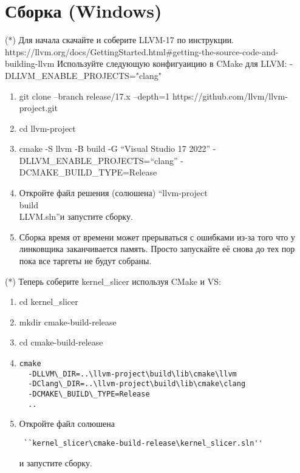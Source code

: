 \documentclass[11pt,fleqn,english,russian]{report} %
\begin{document}
\newpage

\section{Сборка (Windows)}

(*) Для начала скачайте и соберите LLVM-17 по инструкции. \newline https://llvm.org/docs/GettingStarted.html\#getting-the-source-code-and-building-llvm \newline
Используйте следующую конфигуаицию в CMake для LLVM: -DLLVM\_ENABLE\_PROJECTS="clang"
\begin{enumerate}
\item git clone --branch release/17.x --depth=1 https://github.com/llvm/llvm-project.git
\item cd llvm-project
\item cmake -S llvm -B build -G ``Visual Studio 17 2022'' -DLLVM\_ENABLE\_PROJECTS=``clang'' -DCMAKE\_BUILD\_TYPE=Release
\item Откройте файл решения (солюшена) ``llvm-project\\build\\LLVM.sln''и запустите сборку.
\item Сборка время от времени может прерываться с ошибками из-за того что у линковщика заканчивается память. Просто запускайте её снова до тех пор пока все таргеты не будут собраны.
\end{enumerate}

\hspace{3ex}
\newline\noindent (*) Теперь соберите kernel\_slicer используя CMake и VS:
\begin{enumerate}
\item cd kernel\_slicer
\item mkdir cmake-build-release 
\item cd cmake-build-release
\item \begin{verbatim}cmake 
  -DLLVM\_DIR=..\llvm-project\build\lib\cmake\llvm 
  -DClang\_DIR=..\llvm-project\build\lib\cmake\clang 
  -DCMAKE\_BUILD\_TYPE=Release 
  .. \end{verbatim}
\item Откройте файл солюшена \begin{verbatim} ``kernel_slicer\cmake-build-release\kernel_slicer.sln'' \end{verbatim} и запустите сборку.
\end{enumerate}
\end{document}
